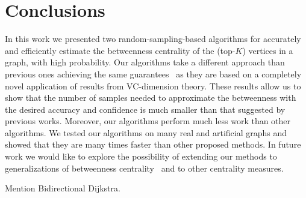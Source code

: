 \section{Conclusions}\label{sec:concl}
In this work we presented two random-sampling-based algorithms for accurately and
efficiently estimate the betweenness centrality of the (top-$K$) vertices in a
graph, with high probability.
Our algorithms take a different approach than previous ones achieving the same
guarantees~\citep{BrandesP07,GeisbergerSS08,JacobKLPT05} as they are based on a
completely novel application of results from VC-dimension theory. These results
allow us to show that the number of samples needed to approximate the
betweenness with the desired accuracy and confidence is much smaller than that
suggested by previous works. Moreover, our algorithms perform much less work
than other algorithms. We tested our algorithms on many real and artificial
graphs and showed that they are many times faster than other proposed methods.
In future work we would like to explore the possibility of extending our methods
to generalizations of betweenness centrality~\citep{KourtellisASIT12,DolevEP10}
and to other centrality measures.

\XXX Mention Bidirectional Dijkstra.

